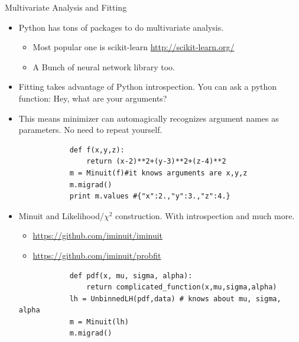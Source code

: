 \documentclass{beamer}
\begin{document}
\begin{frame}[fragile, shrink=5]{Multivariate Analysis and Fitting}
	\begin{itemize}
	\item Python has tons of packages to do multivariate analysis.
		\begin{itemize}
			\item Most popular one is scikit-learn
				\url{http://scikit-learn.org/}
			\item A Bunch of neural network library too.
		\end{itemize}
	\item Fitting takes advantage of Python introspection. You can ask a python function: Hey,
	what are your arguments? 
	\item This means minimizer can 
	automagically recognizes argument names as parameters. No need to repeat
	yourself.
		\begin{verbatim}
			def f(x,y,z):
			    return (x-2)**2+(y-3)**2+(z-4)**2
			m = Minuit(f)#it knows arguments are x,y,z
			m.migrad()
			print m.values #{"x":2.,"y":3.,"z":4.}
		\end{verbatim}
	\item Minuit and Likelihood/$\chi^2$ construction. With introspection and much more.
		\begin{itemize}
			\item \url{https://github.com/iminuit/iminuit}
			\item \url{https://github.com/iminuit/probfit}
				
		\end{itemize}
		\begin{verbatim}
			def pdf(x, mu, sigma, alpha):
			    return complicated_function(x,mu,sigma,alpha)
			lh = UnbinnedLH(pdf,data) # knows about mu, sigma, alpha
			m = Minuit(lh)
			m.migrad()
		\end{verbatim}
	\end{itemize}
\end{frame}
\end{document}
